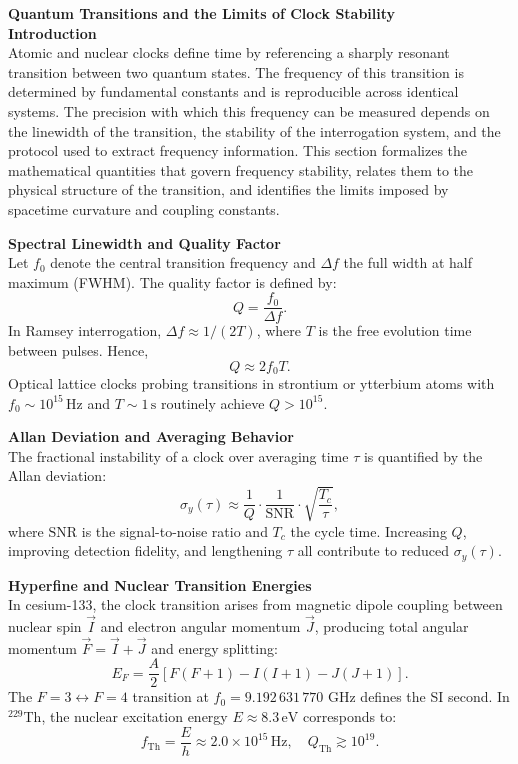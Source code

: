 \begin{technical}
{\Large\textbf{Quantum Transitions and the Limits of Clock Stability}}\\[0.7em]
\textbf{Introduction}\\[0.5em]
Atomic and nuclear clocks define time by referencing a sharply resonant transition between two quantum states. The frequency of this transition is determined by fundamental constants and is reproducible across identical systems. The precision with which this frequency can be measured depends on the linewidth of the transition, the stability of the interrogation system, and the protocol used to extract frequency information. This section formalizes the mathematical quantities that govern frequency stability, relates them to the physical structure of the transition, and identifies the limits imposed by spacetime curvature and coupling constants.

\textbf{Spectral Linewidth and Quality Factor}\\[0.5em]
Let $f_0$ denote the central transition frequency and $\Delta f$ the full width at half maximum (FWHM). The quality factor is defined by:
\[
Q = \frac{f_0}{\Delta f}.
\]
In Ramsey interrogation, $\Delta f \approx 1/(2T)$, where $T$ is the free evolution time between pulses. Hence,
\[
Q \approx 2 f_0 T.
\]
Optical lattice clocks probing transitions in strontium or ytterbium atoms with $f_0 \sim 10^{15}\,\mathrm{Hz}$ and $T \sim 1\,\mathrm{s}$ routinely achieve $Q > 10^{15}$.

\textbf{Allan Deviation and Averaging Behavior}\\[0.5em]
The fractional instability of a clock over averaging time $\tau$ is quantified by the Allan deviation:
\[
\sigma_y(\tau) \approx \frac{1}{Q} \cdot \frac{1}{\mathrm{SNR}} \cdot \sqrt{\frac{T_c}{\tau}},
\]
where $\mathrm{SNR}$ is the signal-to-noise ratio and $T_c$ the cycle time. Increasing $Q$, improving detection fidelity, and lengthening $\tau$ all contribute to reduced $\sigma_y(\tau)$.

\textbf{Hyperfine and Nuclear Transition Energies}\\[0.5em]
In cesium-133, the clock transition arises from magnetic dipole coupling between nuclear spin $\vec{I}$ and electron angular momentum $\vec{J}$, producing total angular momentum $\vec{F} = \vec{I} + \vec{J}$ and energy splitting:
\[
E_F = \frac{A}{2} \left[ F(F+1) - I(I+1) - J(J+1) \right].
\]
The $F=3 \leftrightarrow F=4$ transition at $f_0 = 9.192\,631\,770$ GHz defines the SI second. In $^{229}$Th, the nuclear excitation energy $E \approx 8.3\,\mathrm{eV}$ corresponds to:
\[
f_{\mathrm{Th}} = \frac{E}{h} \approx 2.0 \times 10^{15}\,\mathrm{Hz}, \quad Q_{\mathrm{Th}} \gtrsim 10^{19}.
\]


\end{technical}
